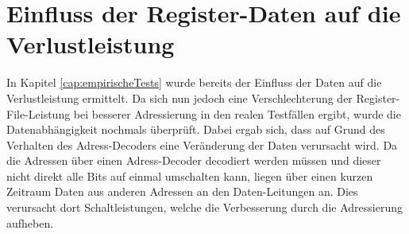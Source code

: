 
 


\section{Einfluss der Register-Daten auf die Verlustleistung}
In Kapitel \ref{cap:empirischeTests} wurde bereits der Einfluss der Daten auf die Verlustleistung ermittelt. Da sich nun jedoch eine Verschlechterung der Register-File-Leistung bei besserer Adressierung in den realen Testfällen ergibt, wurde die Datenabhängigkeit nochmals überprüft. Dabei ergab sich, dass auf Grund des Verhalten des Adress-Decoders eine Veränderung der Daten verursacht wird. Da die Adressen über einen Adress-Decoder decodiert werden müssen und dieser nicht direkt alle Bits auf einmal umschalten kann, liegen über einen kurzen Zeitraum Daten aus anderen Adressen an den Daten-Leitungen an. Dies verursacht dort Schaltleistungen, welche die Verbesserung durch die Adressierung aufheben.
%

